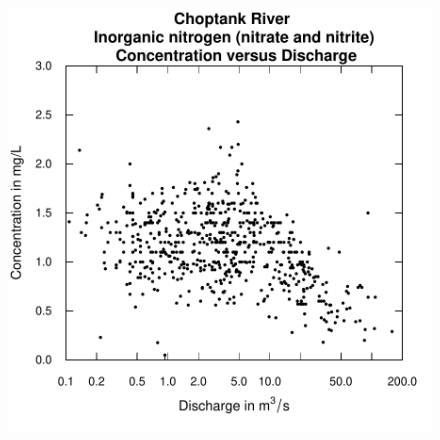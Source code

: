 \documentclass[a4paper,11pt]{article}
\begin{document}
\begin{figure}[htbp]
  \begin{minipage}[h]{0.5\linewidth}
    \begin{center}

\includegraphics{EGRET-figplotConcQ}
    \label{fig:plotConcQ}
    \end{center}
  \end{minipage}
  \begin{minipage}[h]{0.5\linewidth}
    \begin{center}



\end{center}
\end{minipage}
\end{figure}
\end{document}
